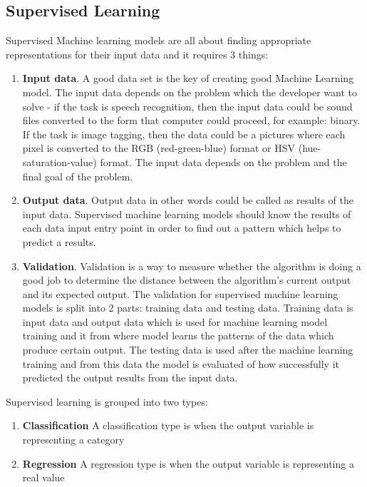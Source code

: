 \subsection{Supervised Learning}

Supervised Machine learning models are all about finding appropriate representations for their input data and it requires 3 things:
\begin{enumerate}
    \item \textbf{Input data}. A good data set is the key of creating good Machine Learning model. The input data depends on the problem which the developer want to solve - if the task is speech recognition, then the input data could be sound files converted to the form that computer could proceed, for example: binary. If the task is image tagging, then the data could be a pictures where each pixel is converted to the RGB (red-green-blue) format or HSV (hue-saturation-value) format. The input data depends on the problem and the final goal of the problem. 
    \item \textbf{Output data}. Output data in other words could be called as results of the input data. Supervised machine learning models should know the results of each data input entry point in order to find out a pattern which helps to predict a results. 
    \item \textbf{Validation}. Validation is a way to measure whether the algorithm is doing a good job to determine the distance between the algorithm's current output and its expected output. The validation for supervised machine learning models is split into 2 parts: training data and testing data. Training data is input data and output data which is used for machine learning model training and it from where model learns the patterns of the data which produce certain output. The testing data is used after the machine learning training and from this data the model is evaluated of how successfully it predicted the output results from the input data.
\end{enumerate}


Supervised learning is grouped into two types:

\begin{enumerate}
    \item \textbf{Classification} A classification type is when the output variable is representing a category
    \item \textbf{Regression} A regression type is when the output variable is representing a real value
\end{enumerate}

